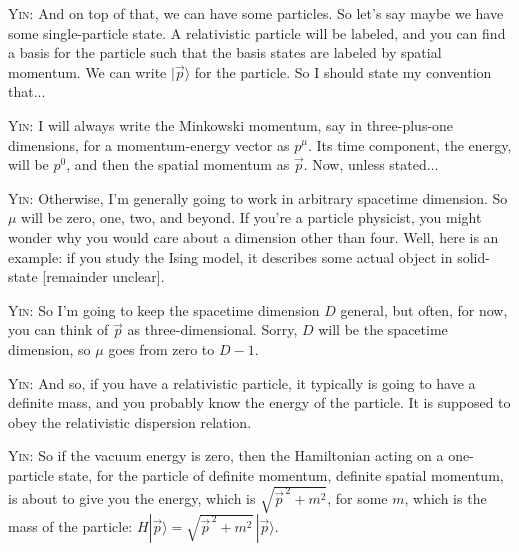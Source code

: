\noindent\textsc{Yin:} And on top of that, we can have some particles. So let's say maybe we have some single-particle state. A relativistic particle will be labeled, and you can find a basis for the particle such that the basis states are labeled by spatial momentum. We can write $|\vec p\rangle$ for the particle. So I should state my convention that...\par

\noindent\textsc{Yin:} I will always write the Minkowski momentum, say in three-plus-one dimensions, for a momentum-energy vector as $p^\mu$. Its time component, the energy, will be $p^0$, and then the spatial momentum as $\vec p$. Now, unless stated...\par

\noindent\textsc{Yin:} Otherwise, I'm generally going to work in arbitrary spacetime dimension. So $\mu$ will be zero, one, two, and beyond. If you're a particle physicist, you might wonder why you would care about a dimension other than four. Well, here is an example: if you study the Ising model, it describes some actual object in solid-state [remainder unclear].\par

\noindent\textsc{Yin:} So I'm going to keep the spacetime dimension $D$ general, but often, for now, you can think of $\vec p$ as three-dimensional. Sorry, $D$ will be the spacetime dimension, so $\mu$ goes from zero to $D-1$.\par

\noindent\textsc{Yin:} And so, if you have a relativistic particle, it typically is going to have a definite mass, and you probably know the energy of the particle. It is supposed to obey the relativistic dispersion relation.\par

\noindent\textsc{Yin:} So if the vacuum energy is zero, then the Hamiltonian acting on a one-particle state, for the particle of definite momentum, definite spatial momentum, is about to give you the energy, which is $\sqrt{\vec p^{\,2}+m^2}$, for some $m$, which is the mass of the particle: $H|\vec p\rangle=\sqrt{\vec p^{\,2}+m^2}\,|\vec p\rangle$.\par

